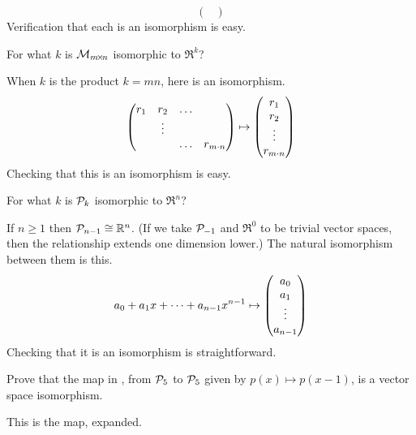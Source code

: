\begin{exercises}
\begin{answer}
\begin{equation*}
\begin{pmatrix}
           \end{pmatrix}
        \end{equation*}     
        Verification that each is an isomorphism is easy.
    \end{answer}
  \recommended \item
    For what \( k \) is \( \mathcal{M}_{m \! \times \! n} \) isomorphic to
    \( \Re^{k} \)?
     \begin{answer}
        When $k$ is the product \( k=mn \), here is an isomorphism.
        \begin{equation*}
           \begin{pmatrix}
              r_1  &r_2  &\ldots  \\
                   &\vdots        \\
                   &     &\ldots  &r_{m\cdot n}
           \end{pmatrix}
           \mapsto
           \begin{pmatrix} r_1 \\ r_2 \\ \vdots \\ r_{m\cdot n} \end{pmatrix}
        \end{equation*}
        Checking that this is an isomorphism is easy.
      \end{answer}
  \item 
     For what \( k \) is \( \mathcal{P}_k \) isomorphic to \( \Re^n \)?
     \begin{answer}
        If \( n\geq 1 \) then \( \mathcal{P}_{n-1}\cong\mathbb{R}^n \).
        (If we take \( \mathcal{P}_{-1} \) and \( \Re^0 \) to be trivial vector
        spaces, then the relationship extends one dimension lower.)  
        The natural isomorphism between them is this. 
        \begin{equation*}
          a_0+a_1x+\dots+a_{n-1}x^{n-1}
          \mapsto\begin{pmatrix} a_0 \\ a_1 \\ \vdots \\ a_{n-1} \end{pmatrix}
        \end{equation*}
        Checking that it is an isomorphism is straightforward.
     \end{answer}
  \item \label{exer:PolyToPolyLinSubst}
    Prove that the map in ,
    from \( \mathcal{P}_5 \) to \( \mathcal{P}_5 \) given by
    \( p(x)\mapsto p(x-1) \), is a vector space isomorphism.
    \begin{answer}
      This is the map, expanded.
      \begin{align*}

\end{align*}
\end{answer}
\end{exercises}

